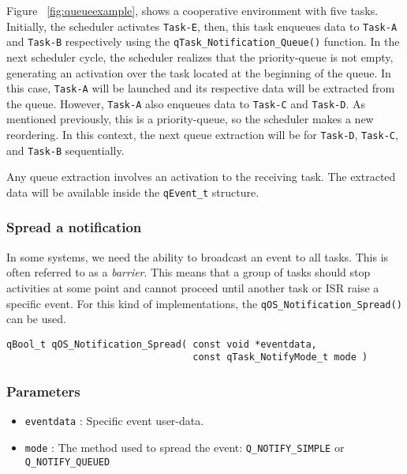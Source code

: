 Figure ~\ref{fig:queueexample}, shows a cooperative environment with five tasks. Initially, the scheduler activates \lstinline{Task-E}, then, this task enqueues data to \lstinline{Task-A} and \lstinline{Task-B} respectively using the \lstinline{qTask_Notification_Queue()} function. In the next scheduler cycle, the scheduler realizes that the priority-queue is not empty, generating an activation over the task located at the beginning of the queue. In this case, \lstinline{Task-A} will be launched and its respective data will be extracted from the queue. However, \lstinline{Task-A} also enqueues data to \lstinline{Task-C} and \lstinline{Task-D}. As mentioned previously, this is a priority-queue, so the scheduler makes a new reordering. In this context, the next queue extraction will be for \lstinline{Task-D}, \lstinline{Task-C}, and \lstinline{Task-B} sequentially.



\begin{tcolorbox}
\HandRight Any queue extraction involves an activation to the receiving task. The extracted data will be available inside the \lstinline{qEvent_t} structure.
\end{tcolorbox}

\subsubsection{Spread a notification}
In some systems, we need the ability to broadcast an event to all tasks. This is often referred to as a \textit{barrier}. This means that a group of tasks should stop activities at some point and cannot proceed until another task or ISR raise a specific event. 
For this kind of implementations, the \lstinline{qOS_Notification_Spread()}  can be used. 
\medskip
\begin{lstlisting}[style=CStyle]
qBool_t qOS_Notification_Spread( const void *eventdata, 
                                 const qTask_NotifyMode_t mode )
\end{lstlisting}

\subsubsection*{Parameters}
\begin{itemize}
    \item \lstinline{eventdata} : Specific event user-data. 
    \item \lstinline{mode} : The method used to spread the event: \lstinline{Q_NOTIFY_SIMPLE} or \lstinline{Q_NOTIFY_QUEUED}
\end{itemize}

